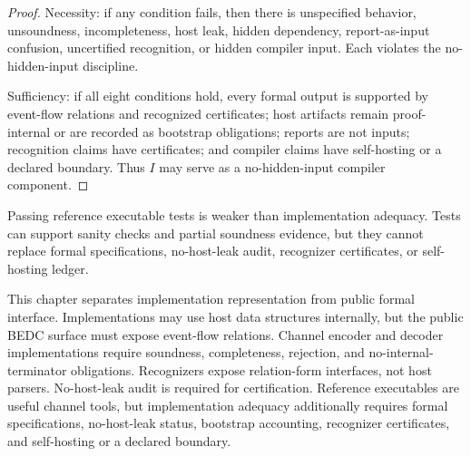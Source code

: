 \begin{proof}
Necessity: if any condition fails, then there is unspecified behavior, unsoundness, incompleteness, host leak, hidden dependency, report-as-input confusion, uncertified recognition, or hidden compiler input. Each violates the no-hidden-input discipline.

Sufficiency: if all eight conditions hold, every formal output is supported by event-flow relations and recognized certificates; host artifacts remain proof-internal or are recorded as bootstrap obligations; reports are not inputs; recognition claims have certificates; and compiler claims have self-hosting or a declared boundary. Thus $I$ may serve as a no-hidden-input compiler component.
\end{proof}

\begin{corollary}
\label{cor:implementation-interface-tests-weaker-than-adequacy}
Passing reference executable tests is weaker than implementation adequacy. Tests can support sanity checks and partial soundness evidence, but they cannot replace formal specifications, no-host-leak audit, recognizer certificates, or self-hosting ledger.
\end{corollary}

\begin{remark}[Summary]
\label{rem:implementation-interface-summary}
This chapter separates implementation representation from public formal interface. Implementations may use host data structures internally, but the public BEDC surface must expose event-flow relations. Channel encoder and decoder implementations require soundness, completeness, rejection, and no-internal-terminator obligations. Recognizers expose relation-form interfaces, not host parsers. No-host-leak audit is required for certification. Reference executables are useful channel tools, but implementation adequacy additionally requires formal specifications, no-host-leak status, bootstrap accounting, recognizer certificates, and self-hosting or a declared boundary.
\end{remark}
